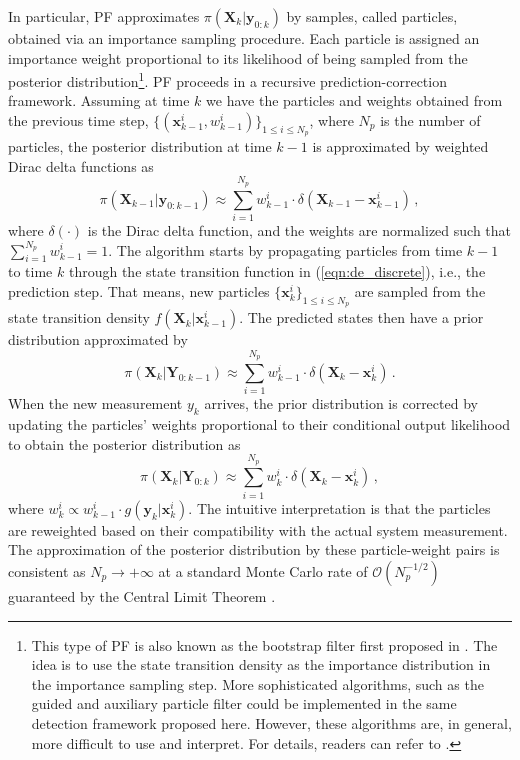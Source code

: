 In particular, PF approximates $\pi(\boldsymbol{X}_k | \boldsymbol{y}_{0:k})$ by samples, called particles, obtained via an importance sampling procedure. Each particle is assigned an importance weight proportional to its likelihood of being sampled from the posterior distribution\footnote{This type of PF is also known as the bootstrap filter first proposed in \cite{Gordon1993}. The idea is to use the state transition density as the importance distribution in the importance sampling step. More sophisticated algorithms, such as the guided and auxiliary particle filter could be implemented in the same detection framework proposed here. However, these algorithms are, in general, more difficult to use and interpret. For details, readers can refer to \cite{doucet2009tutorial}.}. PF proceeds in a recursive prediction-correction framework. Assuming at time $k$ we have the particles and weights obtained from the previous time step, $\{(\boldsymbol{x}_{k-1}^{i}, w_{k-1}^{i})\}_{1\leq i \leq N_p}$, where $N_p$ is the number of particles, the posterior distribution at time $k-1$ is approximated by weighted Dirac delta functions as
\begin{equation}
\pi(\boldsymbol{X}_{k-1} | \boldsymbol{y}_{0:k-1}) \approx \sum_{i=1}^{N_{p}} w_{k-1}^{i} \cdot \delta(\boldsymbol{X}_{k-1}-\boldsymbol{x}_{k-1}^{i}) \,,
\end{equation} where $\delta (\cdot)$ is the Dirac delta function, and the weights are normalized such that $\sum_{i=1}^{N_{p}} w_{k-1}^{i} = 1$. The algorithm starts by propagating particles from time $k-1$ to time $k$ through the state transition function in (\ref{eqn:de_discrete}), i.e., the prediction step. That means, new particles $\{\boldsymbol{x}_k^{i}\}_{1\leq i \leq N_p}$ are sampled from the state transition density $f(\boldsymbol{X}_k|\boldsymbol{x}_{k-1}^{i})$. The predicted states then have a prior distribution approximated by 
\begin{equation}
\label{eqn:prediction}
\pi(\boldsymbol{X}_k | \boldsymbol{Y}_{0: k-1}) \approx \sum_{i=1}^{N_{p}} w_{k-1}^{i} \cdot \delta(\boldsymbol{X}_k-\boldsymbol{x}_k^{i}) \,.
\end{equation}
When the new measurement $y_k$ arrives, the prior distribution is corrected by updating the particles' weights proportional to their conditional output likelihood to obtain the posterior distribution as 
\begin{equation}
\label{eqn:particle_approx}
\pi(\boldsymbol{X}_k | \boldsymbol{Y}_{0: k}) \approx \sum_{i=1}^{N_{p}} w_k^{i} \cdot \delta(\boldsymbol{X}_k-\boldsymbol{x}_k^{i}) \,,
\end{equation} where 
$w_k^{i} \propto  w_{k-1}^{i} \cdot g(\boldsymbol{y}_k | \boldsymbol{x}_k^{i})$.
The intuitive interpretation is that the particles are reweighted based on their compatibility with the actual system measurement. The approximation of the posterior distribution by these particle-weight pairs is consistent as $N_p \rightarrow +\infty$ at a standard Monte Carlo rate of $\mathcal{O}(N_{p}^{-1/2})$ guaranteed by the Central Limit Theorem \cite{doucet2009tutorial}. 

